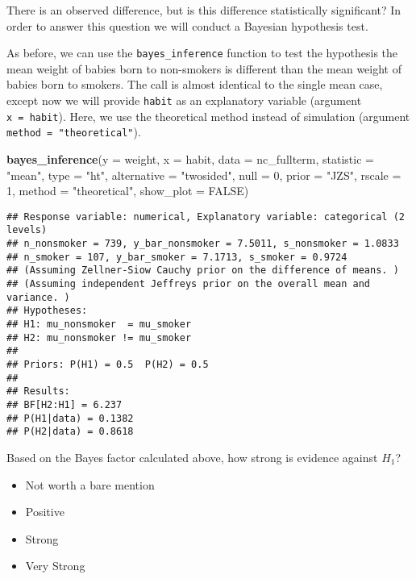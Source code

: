 \documentclass[]{article}
\newenvironment{Shaded}{\begin{snugshade}}{\end{snugshade}}
\newcommand{\KeywordTok}[1]{\textcolor[rgb]{0.13,0.29,0.53}{\textbf{#1}}}
\newcommand{\DataTypeTok}[1]{\textcolor[rgb]{0.13,0.29,0.53}{#1}}
\newcommand{\DecValTok}[1]{\textcolor[rgb]{0.00,0.00,0.81}{#1}}
\newcommand{\StringTok}[1]{\textcolor[rgb]{0.31,0.60,0.02}{#1}}
\newcommand{\OtherTok}[1]{\textcolor[rgb]{0.56,0.35,0.01}{#1}}
\newcommand{\NormalTok}[1]{#1}
\providecommand{\tightlist}{%
  \setlength{\itemsep}{0pt}\setlength{\parskip}{0pt}}
\begin{document}
There is an observed difference, but is this difference statistically
significant? In order to answer this question we will conduct a Bayesian
hypothesis test.

As before, we can use the \texttt{bayes\_inference} function to test the
hypothesis the mean weight of babies born to non-smokers is different
than the mean weight of babies born to smokers. The call is almost
identical to the single mean case, except now we will provide
\texttt{habit} as an explanatory variable (argument
\texttt{x\ =\ habit}). Here, we use the theoretical method instead of
simulation (argument \texttt{method\ =\ "theoretical"}).

\begin{Shaded}
\begin{Highlighting}[]
\KeywordTok{bayes_inference}\NormalTok{(}\DataTypeTok{y =}\NormalTok{ weight, }\DataTypeTok{x =}\NormalTok{ habit, }\DataTypeTok{data =}\NormalTok{ nc_fullterm, }
                \DataTypeTok{statistic =} \StringTok{"mean"}\NormalTok{, }
                \DataTypeTok{type =} \StringTok{"ht"}\NormalTok{, }\DataTypeTok{alternative =} \StringTok{"twosided"}\NormalTok{, }\DataTypeTok{null =} \DecValTok{0}\NormalTok{, }
                \DataTypeTok{prior =} \StringTok{"JZS"}\NormalTok{, }\DataTypeTok{rscale =} \DecValTok{1}\NormalTok{, }
                \DataTypeTok{method =} \StringTok{"theoretical"}\NormalTok{, }\DataTypeTok{show_plot =} \OtherTok{FALSE}\NormalTok{)}
\end{Highlighting}
\end{Shaded}

\begin{verbatim}
## Response variable: numerical, Explanatory variable: categorical (2 levels)
## n_nonsmoker = 739, y_bar_nonsmoker = 7.5011, s_nonsmoker = 1.0833
## n_smoker = 107, y_bar_smoker = 7.1713, s_smoker = 0.9724
## (Assuming Zellner-Siow Cauchy prior on the difference of means. )
## (Assuming independent Jeffreys prior on the overall mean and variance. )
## Hypotheses:
## H1: mu_nonsmoker  = mu_smoker
## H2: mu_nonsmoker != mu_smoker
## 
## Priors: P(H1) = 0.5  P(H2) = 0.5 
## 
## Results:
## BF[H2:H1] = 6.237
## P(H1|data) = 0.1382 
## P(H2|data) = 0.8618
\end{verbatim}

Based on the Bayes factor calculated above, how strong is evidence
against \(H_1\)?

\begin{itemize}
\tightlist
\item
  Not worth a bare mention
\item
  Positive
\item
  Strong
\item
  Very Strong
\end{itemize}
\end{document}
